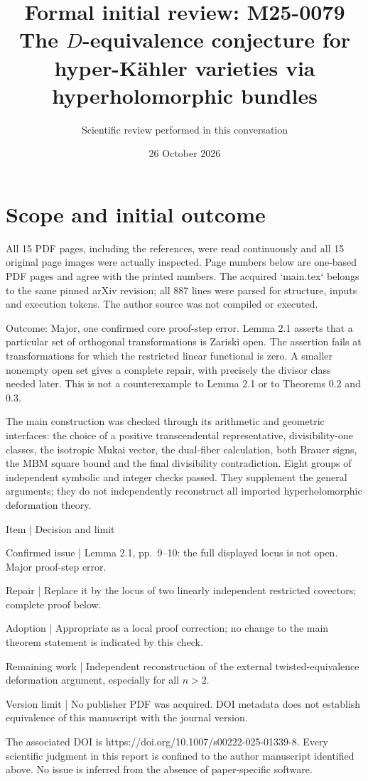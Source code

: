 \documentclass[10pt]{article}
\title{Formal initial review: M25-0079
The \(D\)-equivalence conjecture for hyper-Kähler varieties via hyperholomorphic bundles}
\author{Scientific review performed in this conversation}
\date{26 October 2026}
\begin{document}
\maketitle
\section*{Scope and initial outcome}
All 15 PDF pages, including the references, were read continuously and all 15 original page images were actually inspected. Page numbers below are one-based PDF pages and agree with the printed numbers. The acquired `main.tex` belongs to the same pinned arXiv revision; all 887 lines were parsed for structure, inputs and execution tokens. The author source was not compiled or executed.\par
Outcome: Major, one confirmed core proof-step error. Lemma 2.1 asserts that a particular set of orthogonal transformations is Zariski open. The assertion fails at transformations for which the restricted linear functional is zero. A smaller nonempty open set gives a complete repair, with precisely the divisor class needed later. This is not a counterexample to Lemma 2.1 or to Theorems 0.2 and 0.3.\par
The main construction was checked through its arithmetic and geometric interfaces: the choice of a positive transcendental representative, divisibility-one classes, the isotropic Mukai vector, the dual-fiber calculation, both Brauer signs, the MBM square bound and the final divisibility contradiction. Eight groups of independent symbolic and integer checks passed. They supplement the general arguments; they do not independently reconstruct all imported hyperholomorphic deformation theory.\par
Item | Decision and limit\par
Confirmed issue | Lemma 2.1, pp. 9–10: the full displayed locus is not open. Major proof-step error.\par
Repair | Replace it by the locus of two linearly independent restricted covectors; complete proof below.\par
Adoption | Appropriate as a local proof correction; no change to the main theorem statement is indicated by this check.\par
Remaining work | Independent reconstruction of the external twisted-equivalence deformation argument, especially for all \(n>2\).\par
Version limit | No publisher PDF was acquired. DOI metadata does not establish equivalence of this manuscript with the journal version.\par
The associated DOI is https://doi.org/10.1007/s00222-025-01339-8. Every scientific judgment in this report is confined to the author manuscript identified above. No issue is inferred from the absence of paper-specific software.\par
\end{document}
